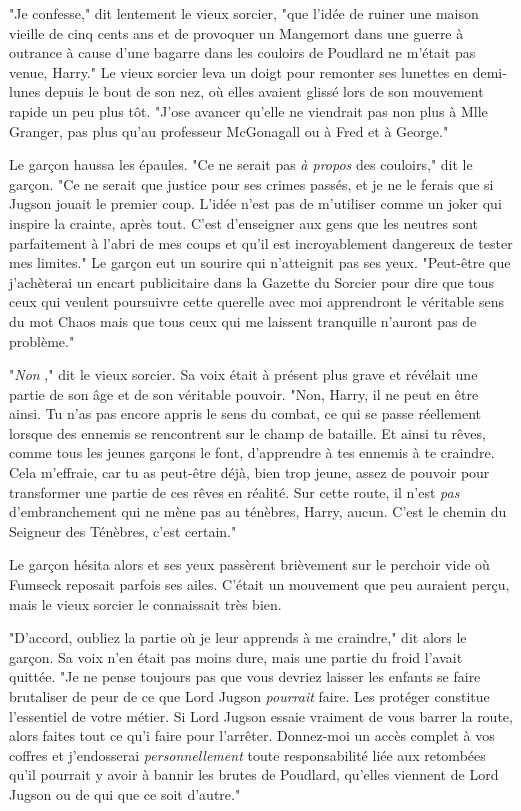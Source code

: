 "Je confesse," dit lentement le vieux sorcier, "que l'idée de ruiner une maison vieille de cinq cents ans et de provoquer un Mangemort dans une guerre à outrance à cause d'une bagarre dans les couloirs de Poudlard ne m'était pas venue, Harry." Le vieux sorcier leva un doigt pour remonter ses lunettes en demi-lunes depuis le bout de son nez, où elles avaient glissé lors de son mouvement rapide un peu plus tôt. "J'ose avancer qu'elle ne viendrait pas non plus à Mlle Granger, pas plus qu'au professeur McGonagall ou à Fred et à George."

Le garçon haussa les épaules. "Ce ne serait pas \emph{à propos } des couloirs," dit le garçon. "Ce ne serait que justice pour ses crimes passés, et je ne le ferais que si Jugson jouait le premier coup. L'idée n'est pas de m'utiliser comme un joker qui inspire la crainte, après tout. C'est d'enseigner aux gens que les neutres sont parfaitement à l'abri de mes coups et qu'il est incroyablement dangereux de tester mes limites." Le garçon eut un sourire qui n'atteignit pas ses yeux. "Peut-être que j'achèterai un encart publicitaire dans la Gazette du Sorcier pour dire que tous ceux qui veulent poursuivre cette querelle avec moi apprendront le véritable sens du mot Chaos mais que tous ceux qui me laissent tranquille n'auront pas de problème."

"\emph{Non} ," dit le vieux sorcier. Sa voix était à présent plus grave et révélait une partie de son âge et de son véritable pouvoir. "Non, Harry, il ne peut en être ainsi. Tu n'as pas encore appris le sens du combat, ce qui se passe réellement lorsque des ennemis se rencontrent sur le champ de bataille. Et ainsi tu rêves, comme tous les jeunes garçons le font, d'apprendre à tes ennemis à te craindre. Cela m'effraie, car tu as peut-être déjà, bien trop jeune, assez de pouvoir pour transformer une partie de ces rêves en réalité. Sur cette route, il n'est \emph{pas } d'embranchement qui ne mène pas au ténèbres, Harry, aucun. C'est le chemin du Seigneur des Ténèbres, c'est certain."

Le garçon hésita alors et ses yeux passèrent brièvement sur le perchoir vide où Fumseck reposait parfois ses ailes. C'était un mouvement que peu auraient perçu, mais le vieux sorcier le connaissait très bien.

"D'accord, oubliez la partie où je leur apprends à me craindre," dit alors le garçon. Sa voix n'en était pas moins dure, mais une partie du froid l'avait quittée. "Je ne pense toujours pas que vous devriez laisser les enfants se faire brutaliser de peur de ce que Lord Jugson \emph{pourrait}  faire. Les protéger constitue l'essentiel de votre métier. Si Lord Jugson essaie vraiment de vous barrer la route, alors faites tout ce qu'i faire pour l'arrêter. Donnez-moi un accès complet à vos coffres et j'endosserai \emph{personnellement}  toute responsabilité liée aux retombées qu'il pourrait y avoir à bannir les brutes de Poudlard, qu'elles viennent de Lord Jugson ou de qui que ce soit d'autre."

